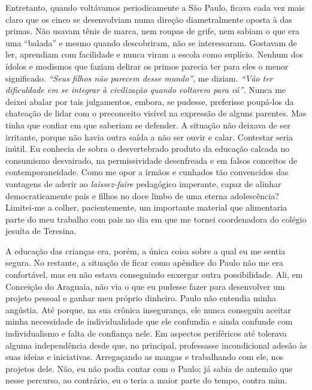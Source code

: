 Entretanto, quando voltávamos periodicamente a São Paulo, ficava cada vez mais claro que os cinco se desenvolviam numa direção diametralmente oposta à das primas.
Não usavam tênis de marca, nem roupas de grife, nem sabiam o que era uma ``balada'' e mesmo quando descobriram, não se interessaram.
Gostavam de ler, aprendiam com facilidade e nunca viram a escola como suplício.
Nenhum dos ídolos e modismos que faziam delirar os primos parecia ter para eles o menor significado.
\textit{``Seus filhos não parecem desse mundo''}, me diziam.
\textit{``Vão ter dificuldade em se integrar à civilização quando voltarem para cá''}.
Nunca me deixei abalar por tais julgamentos, embora, se pudesse, preferisse poupá-los da chateação de lidar com o preconceito visível na expressão de alguns parentes.
Mas tinha que confiar em que saberiam se defender.
A situação não deixava de ser irritante, porque não havia outra saída a não ser ouvir e calar.
Contestar seria inútil.
Eu conhecia de sobra o desvertebrado produto da educação calcada no consumismo desvairado, na permissividade desenfreada e em falsos conceitos de contemporaneidade.
Como me opor a irmãos e cunhados tão convencidos das vantagens de aderir ao \textit{laissez-faire} pedagógico imperante, capaz de alinhar democraticamente pais e filhos no doce limbo de uma eterna adolescência? Limitei-me a colher, pacientemente, um importante material que alimentaria parte do meu trabalho com pais no dia em que me tornei coordenadora do colégio jesuíta de Teresina.

A educação das crianças era, porém, a única coisa sobre a qual eu me sentia segura.
No restante, a situação de ficar como apêndice do Paulo não me era confortável, mas eu não estava conseguindo enxergar outra possibilidade.
Ali, em Conceição do Araguaia, não via o que eu pudesse fazer para desenvolver um projeto pessoal e ganhar meu próprio dinheiro.
Paulo não entendia minha angústia.
Até porque, na sua crônica insegurança, ele nunca conseguiu aceitar minha necessidade de individualidade que ele confundia e ainda confunde com individualismo e falta de confiança nele.
Em aspectos periféricos até tolerava alguma independência desde que, no principal, professasse incondicional adesão às suas ideias e iniciativas.
Arregaçando as mangas e trabalhando com ele, nos projetos dele.
Não, eu não podia contar com o Paulo; já sabia de antemão que nesse percurso, ao contrário, eu o teria a maior parte do tempo, contra mim.

